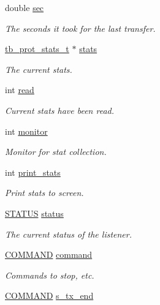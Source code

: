 \begin{DoxyCompactItemize}
double \hyperlink{structtb__listener__t_a741d9964fa8029b9468528756ea835af}{sec}
\begin{DoxyCompactList}\small\item\em The seconds it took for the last transfer. \end{DoxyCompactList}\item 
\hyperlink{structtb__prot__stats__t}{tb\-\_\-prot\-\_\-stats\-\_\-t} $\ast$ \hyperlink{structtb__listener__t_a464593aa6d4c80e0f689c501c4e81e8c}{stats}
\begin{DoxyCompactList}\small\item\em The current stats. \end{DoxyCompactList}\item 
int \hyperlink{structtb__listener__t_ad91878c8e805d88354749a9fbfee4296}{read}
\begin{DoxyCompactList}\small\item\em Current stats have been read. \end{DoxyCompactList}\item 
int \hyperlink{structtb__listener__t_a46fa1969de5714507943035793d36269}{monitor}
\begin{DoxyCompactList}\small\item\em Monitor for stat collection. \end{DoxyCompactList}\item 
int \hyperlink{structtb__listener__t_a21a0be842e8fa2c780fa87f45bd5d17e}{print\-\_\-stats}
\begin{DoxyCompactList}\small\item\em Print stats to screen. \end{DoxyCompactList}\item 
\hyperlink{tb__listener_8h_a32c27cc471df37f4fc818d65de0a56c4}{S\-T\-A\-T\-U\-S} \hyperlink{structtb__listener__t_a1025e6cbbd3179d2d91b9b4afb8f8efc}{status}
\begin{DoxyCompactList}\small\item\em The current status of the listener. \end{DoxyCompactList}\item 
\hyperlink{tb__listener_8h_a0fbada5bff0eeb4dc6be4b6e6f1c4eaf}{C\-O\-M\-M\-A\-N\-D} \hyperlink{structtb__listener__t_a70d431da3740b5dedad495c2843ba89e}{command}
\begin{DoxyCompactList}\small\item\em Commands to stop, etc. \end{DoxyCompactList}\item 
\hyperlink{tb__listener_8h_a0fbada5bff0eeb4dc6be4b6e6f1c4eaf}{C\-O\-M\-M\-A\-N\-D} \hyperlink{structtb__listener__t_aea40caaca885ba5ed3e0b82d7ef1f498}{s\-\_\-tx\-\_\-end}

\end{DoxyCompactItemize}
